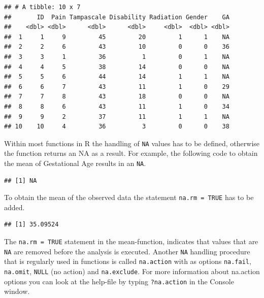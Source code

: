 \documentclass[
]{book}
\newenvironment{Shaded}{\begin{snugshade}}{\end{snugshade}}
\newcommand{\DataTypeTok}[1]{\textcolor[rgb]{0.13,0.29,0.53}{#1}}
\newcommand{\KeywordTok}[1]{\textcolor[rgb]{0.13,0.29,0.53}{\textbf{#1}}}
\newcommand{\NormalTok}[1]{#1}
\newcommand{\OperatorTok}[1]{\textcolor[rgb]{0.81,0.36,0.00}{\textbf{#1}}}
\newcommand{\OtherTok}[1]{\textcolor[rgb]{0.56,0.35,0.01}{#1}}
\begin{document}
\begin{verbatim}
## # A tibble: 10 x 7
##       ID  Pain Tampascale Disability Radiation Gender    GA
##    <dbl> <dbl>      <dbl>      <dbl>     <dbl>  <dbl> <dbl>
##  1     1     9         45         20         1      1    NA
##  2     2     6         43         10         0      0    36
##  3     3     1         36          1         0      1    NA
##  4     4     5         38         14         0      0    NA
##  5     5     6         44         14         1      1    NA
##  6     6     7         43         11         1      0    29
##  7     7     8         43         18         0      0    NA
##  8     8     6         43         11         1      0    34
##  9     9     2         37         11         1      1    NA
## 10    10     4         36          3         0      0    38
\end{verbatim}

Within most functions in R the handling of \texttt{NA} values has to be
defined, otherwise the function returns an NA as a result. For example,
the following code to obtain the mean of Gestational Age results in an
\texttt{NA}.

\begin{Shaded}
\end{Shaded}

\begin{verbatim}
## [1] NA
\end{verbatim}

To obtain the mean of the observed data the statement
\texttt{na.rm\ =\ TRUE} has to be added.

\begin{Shaded}
\end{Shaded}

\begin{verbatim}
## [1] 35.09524
\end{verbatim}

The \texttt{na.rm\ =\ TRUE} statement in the mean-function, indicates
that values that are \texttt{NA} are removed before the analysis is
executed. Another \texttt{NA} handling procedure that is regularly used
in functions is called \texttt{na.action} with as options
\texttt{na.fail}, \texttt{na.omit}, \texttt{NULL} (no action) and
\texttt{na.exclude}. For more information about na.action options you
can look at the help-file by typing \texttt{?na.action} in the Console
window.
\end{document}
